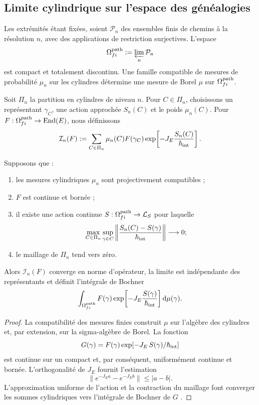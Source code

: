 \subsection{Limite cylindrique sur l’espace des généalogies}

Les extrémités étant fixées, soient \(\mathcal P_n\) des ensembles finis de chemins à la
résolution \(n\), avec des applications de restriction surjectives. L’espace
\[
 \Omega^{\rm path}_{fi}:=\varprojlim_n\mathcal P_n
\]
est compact et totalement discontinu. Une famille compatible de mesures de probabilité \(\mu_n\) sur les cylindres détermine une mesure de Borel \(\mu\) sur \(\Omega^{\rm path}_{fi}\).

Soit \(\Pi_n\) la partition en cylindres de niveau \(n\). Pour
\(C\in\Pi_n\), choisissons un représentant \(\gamma_C\), une action approchée
\(S_n(C)\) et le poids \(\mu_n(C)\). Pour
\(F:\Omega^{\rm path}_{fi}\to\operatorname{End}(E)\), nous définissons
\begin{equation}
 \mathcal I_n(F)
 :=\sum_{C\in\Pi_n}\mu_n(C)F(\gamma_C)
 \exp\!\left[-J_E\frac{S_n(C)}{\hbar_{\rm int}}\right].
 \label{eq:integral-cilindrica-aproximante-rev2}
\end{equation}

\begin{theorem}
\label{thm:integral-genealogica-caminos-rev2}
Supposons que :
\begin{enumerate}
 \item les mesures cylindriques \(\mu_n\) sont projectivement compatibles ;
 \item \(F\) est continue et bornée ;
 \item il existe une action continue \(S:\Omega^{\rm path}_{fi}\to\mathcal L_S\) pour laquelle
 \[
  \max_{C\in\Pi_n}\sup_{\gamma\in C}
  \left\|\frac{S_n(C)-S(\gamma)}{\hbar_{\rm int}}\right\|
  \longrightarrow0;
 \]
 \item le maillage de \(\Pi_n\) tend vers zéro.
\end{enumerate}
Alors \(\mathcal I_n(F)\) converge en norme d’opérateur, la limite est
indépendante des représentants et définit l’intégrale de Bochner
\begin{equation}
 \int_{\Omega^{\rm path}_{fi}}
 F(\gamma)
 \exp\!\left[-J_E\frac{S(\gamma)}{\hbar_{\rm int}}\right]
 \mathrm d\mu(\gamma).
 \label{eq:integral-genealogica-caminos-rev2}
\end{equation}
\end{theorem}

\begin{proof}
La compatibilité des mesures finies construit \(\mu\) sur l'algèbre des cylindres et, par extension, sur la sigma-algèbre de Borel. La fonction
\[
 G(\gamma)=F(\gamma)
 \exp[-J_E\,S(\gamma)/\hbar_{\rm int}]
\]
est continue sur un compact et, par conséquent, uniformément continue et
bornée. L’orthogonalité de \(J_E\) fournit l’estimation
\[
 \|e^{-J_E a}-e^{-J_E b}\|\leq |a-b|.
\]
L’approximation uniforme de l’action et la contraction du maillage font
converger les sommes cylindriques vers l’intégrale de Bochner de \(G\)
\cite{Bochner1955}.
\end{proof}


